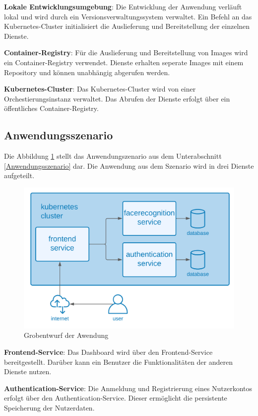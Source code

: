 \textbf{Lokale Entwicklungsumgebung}: Die Entwicklung der Anwendung verläuft lokal und wird durch ein Versionsverwaltungssystem verwaltet.
Ein Befehl an das Kubernetes-Cluster initialisiert die Auslieferung und Bereitstellung der einzelnen Dienste. 

\textbf{Container-Registry}: Für die Auslieferung und Bereitstellung von Images wird ein Container-Registry verwendet.
Dienste erhalten seperate Images mit einem Repository und können unabhängig abgerufen werden.

\textbf{Kubernetes-Cluster}: Das Kubernetes-Cluster wird von einer Orchestierungsinstanz verwaltet.
Das Abrufen der Dienste erfolgt über ein öffentliches Container-Registry.

\subsection{Anwendungsszenario}
Die Abbildung \ref{fig:GrobentwurfAnwendung} stellt das Anwendungszenario aus dem Unterabschnitt \ref{Anwendungsszenario} dar.
Die Anwendung aus dem Szenario wird in drei Dienste aufgeteilt.

\begin{figure}[!htb]
  \centering
  \includegraphics[width=0.8\columnwidth]{images/GrobentwurfAnwendung.png}
  \caption{Grobentwurf der Awendung}
  \label{fig:GrobentwurfAnwendung}
\end{figure}

\textbf{Frontend-Service}: Das Dashboard wird über den Frontend-Service bereitgestellt.
Darüber kann ein Benutzer die Funktionalitäten der anderen Dienste nutzen.

\textbf{Authentication-Service}: Die Anmeldung und Registrierung eines Nutzerkontos erfolgt über den Authentication-Service.
Dieser ermöglicht die persistente Speicherung der Nutzerdaten.

